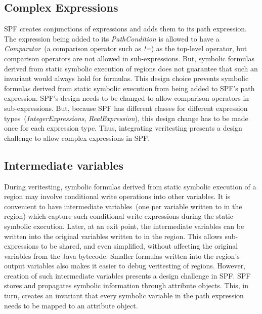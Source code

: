 \subsection{Complex Expressions}
SPF creates conjunctions of expressions and adds them to its path expression.
%
The expression being added to its \textit{PathCondition} is allowed to have a \textit{Comparator}~(a comparison operator such as \textit{!=}) as the top-level operator, but comparison operators are not allowed in sub-expressions.
%
But, symbolic formulas derived from static symbolic execution of regions does not guarantee that such an invariant would always hold for formulas.
%
This design choice prevents symbolic formulas derived from static symbolic execution from being added to SPF\rq s path expression.
%
SPF\rq s design needs to be changed to allow comparison operators in sub-expressions.
%
But, because SPF has different classes for different expression types~(\textit{IntegerExpressions}, \textit{RealExpression}), this design change has to be made once for each expression type.
%
Thus, integrating veritesting presents a design challenge to allow complex expressions in SPF. 

\subsection{Intermediate variables}
%
During veritesting, symbolic formulas derived from static symbolic execution of a region may involve conditional write operations into other variables. 
%
It is convenient to have intermediate variables~(one per variable written to in the region) which capture such conditional write expressions during the static symbolic execution.
%
Later, at an exit point, the intermediate variables can be written into the original variables written to in the region.
%
This allows sub-expressions to be shared, and even simplified, without affecting the original variables from the Java bytecode.
%
Smaller formulas written into the region\rq s output variables also makes it easier to debug veritesting of regions.
%
However, creation of such intermediate variables presents a design challenge in SPF.
%
SPF stores and propagates symbolic information through attribute objects.
%
This, in turn, creates an invariant that every symbolic variable in the path expression needs to be mapped to an attribute object.
